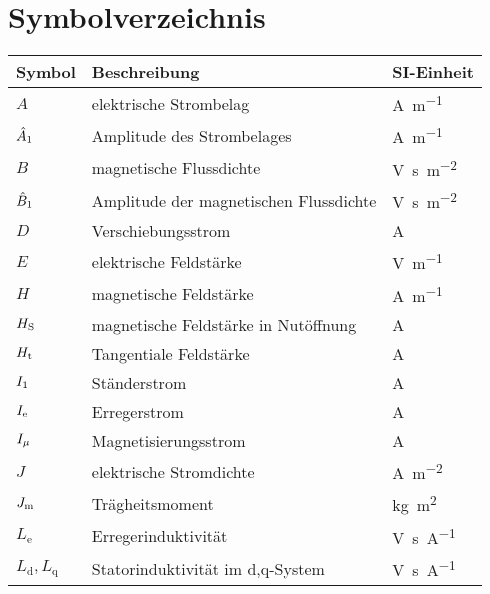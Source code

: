 
\chapter*{Symbolverzeichnis}\label{s.sym}
\begin{flushleft}
\begin{tabularx}{\textwidth}{lll}
\toprule
Symbol & Beschreibung	& SI-Einheit\\
\midrule
$A$			&	elektrische Strombelag  	&  	\si{\ampere\per\meter} \\
$\hat{A}_{\mathrm{1}}$			&	Amplitude des Strombelages  	&  	\si{\ampere\per\meter} \\ 
$B$			&	magnetische Flussdichte		&	\si{\volt\second\per\square\meter} \\
$\hat{B}_{\mathrm{1}}$	 &	Amplitude der magnetischen Flussdichte 	&  	\si{\volt\second\per\square\meter} \\ 
$D$ & Verschiebungsstrom &  \si{\ampere} \\
$E$ & elektrische Feldstärke & \si{\volt\per\meter} \\
$H$			&	magnetische Feldstärke		&	\si{\ampere\per\meter}\\
$H_{\mathrm{S}}$	&   magnetische Feldstärke in Nutöffnung	&	\si{\ampere} \\
$H_{\mathrm{t}}$	&   Tangentiale Feldstärke	&	\si{\ampere} \\
$I_{\mathrm{1}}$	&	Ständerstrom	&	\si{\ampere} \\
$I_{\mathrm{e}}$	&	Erregerstrom	&	\si{\ampere} \\
$I_{\mathrm{\mu}}$	&	Magnetisierungsstrom	&	\si{\ampere} \\
$J$			&	elektrische Stromdichte		&	\si{\ampere\per\square\meter} \\
$J_{\mathrm{m}}$			&	Trägheitsmoment	&	\si{\kilogram\square\meter} \\
$L_\mathrm{e}$	& 	Erregerinduktivität & \si{\volt\second\per\ampere}\\
$L_\mathrm{d}, L_\mathrm{q}$	& 	Statorinduktivität im d,q-System & \si{\volt\second\per\ampere}\\

\end{tabularx}
\end{flushleft}
